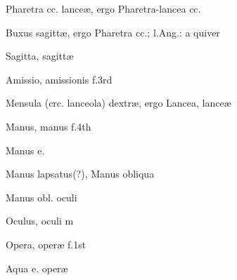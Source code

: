  {} {\mktsStyleItalic{}Pharetra cc. lanceæ\/}, ergo {\mktsStyleItalic{}Pharetra-lancea cc.\/}


 {} {\mktsStyleItalic{}Buxus sagittæ\/}, ergo {\mktsStyleItalic{}Pharetra cc.\/}; l.Ang.: a quiver


 {\mktsStyleItalic{}Sagitta\/}, sagittæ


 {\mktsStyleItalic{}Amissio\/}, amissionis {\mktsStyleItalic{}f.3rd\/}


 {} {\mktsStyleItalic{}Mensula (crc. lanceola) dextræ\/}, ergo {\mktsStyleItalic{}Lancea\/}, lanceæ


 {\mktsStyleItalic{}Manus\/}, manus {\mktsStyleItalic{}f.4th\/}


 {\mktsStyleItalic{}Manus e.\/}


 {\mktsStyleItalic{}Manus lapsatus(?)\/}, {\mktsStyleItalic{}Manus obliqua\/}


 {\mktsStyleItalic{}Manus obl. oculi\/}


 {\mktsStyleItalic{}Oculus\/}, oculi {\mktsStyleItalic{}m\/}


 {\mktsStyleItalic{}Opera\/}, operæ {\mktsStyleItalic{}f.1st\/}


 {\mktsStyleItalic{}Aqua e. operæ\/}



